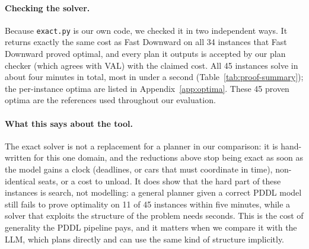 \begin{table}[t]
  \centering\small
  
  \caption{Proving the 45 reference plans optimal. Fast Downward ran A$^*$ with LM-cut, then
  A$^*$ with merge-and-shrink, with a 300\,s limit for each search. \texttt{exact.py} times are
  single-threaded Python on one core.}
  \label{tab:proof-summary}
\end{table}

\begin{table}[t]
  \centering\small
  
  \caption{The 11 instances Fast Downward could not prove optimal in 300\,s, with the optimum
  found by \texttt{exact.py}. ``Old reference'' is the cheaper of the Fast Downward plans for
  the splitting and no-split domains, which we used before the exact solver.}
  \label{tab:unproven}
\end{table}

\paragraph{Checking the solver.}
Because \texttt{exact.py} is our own code, we checked it in two independent ways. It returns
exactly the same cost as Fast Downward on all 34 instances that Fast Downward proved optimal,
and every plan it outputs is accepted by our plan checker (which agrees with VAL) with the
claimed cost. All 45 instances solve in about four minutes in total, most in under a second
(Table~\ref{tab:proof-summary}); the per-instance optima are listed in
Appendix~\ref{app:optima}. These 45 proven optima are the references used throughout our
evaluation.

\paragraph{What this says about the tool.}
The exact solver is not a replacement for a planner in our comparison: it is hand-written for
this one domain, and the reductions above stop being exact as soon as the model gains a clock
(deadlines, or cars that must coordinate in time), non-identical seats, or a cost to unload.
It does show that the hard part of these instances is search, not modelling: a general
planner given a correct PDDL model still fails to prove optimality on 11 of 45 instances
within five minutes, while a solver that exploits the structure of the problem needs seconds.
This is the cost of generality the PDDL pipeline pays, and it matters when we compare it with
the LLM, which plans directly and can use the same kind of structure implicitly.
